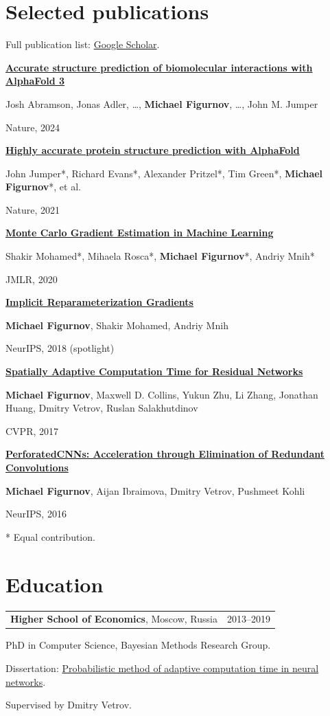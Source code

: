 \documentclass[10pt,a4paper]{article}
\makeatletter
\newcommand{\dated}[2]{\par\begin{tabularx}{\linewidth}{@{}Xr@{}}#1 & {\small\color{muted}#2}\end{tabularx}\par}
\newcommand{\paper}[4]{%
  \vspace{3pt}\href{#1}{\textbf{#2}}\par
  {\small #3\par}
  {\small\color{muted}#4\par}
}
\makeatother
\begin{document}
\section*{Selected publications}
{\small Full publication list: \href{https://scholar.google.com/citations?user=qd0tOpQAAAAJ}{Google Scholar}.\par}

\paper{https://www.nature.com/articles/s41586-024-07487-w}
{Accurate structure prediction of biomolecular interactions with AlphaFold 3}
{Josh Abramson, Jonas Adler, \ldots, \textbf{Michael Figurnov}, \ldots, John M. Jumper}
{Nature, 2024}

\paper{https://www.nature.com/articles/s41586-021-03819-2}
{Highly accurate protein structure prediction with AlphaFold}
{John Jumper*, Richard Evans*, Alexander Pritzel*, Tim Green*, \textbf{Michael Figurnov}*, et al.}
{Nature, 2021}

\paper{https://arxiv.org/abs/1906.10652}
{Monte Carlo Gradient Estimation in Machine Learning}
{Shakir Mohamed*, Mihaela Rosca*, \textbf{Michael Figurnov}*, Andriy Mnih*}
{JMLR, 2020}

\paper{https://arxiv.org/abs/1805.08498}
{Implicit Reparameterization Gradients}
{\textbf{Michael Figurnov}, Shakir Mohamed, Andriy Mnih}
{NeurIPS, 2018 (spotlight)}

\paper{https://arxiv.org/abs/1612.02297}
{Spatially Adaptive Computation Time for Residual Networks}
{\textbf{Michael Figurnov}, Maxwell D. Collins, Yukun Zhu, Li Zhang, Jonathan Huang, Dmitry Vetrov, Ruslan Salakhutdinov}
{CVPR, 2017}

\paper{https://arxiv.org/abs/1504.08362}
{PerforatedCNNs: Acceleration through Elimination of Redundant Convolutions}
{\textbf{Michael Figurnov}, Aijan Ibraimova, Dmitry Vetrov, Pushmeet Kohli}
{NeurIPS, 2016}
{\footnotesize\color{muted}* Equal contribution.\par}

\newpage
\section*{Education}
\dated{\textbf{Higher School of Economics}, Moscow, Russia}{2013--2019}
PhD in Computer Science, Bayesian Methods Research Group.\par
Dissertation: \href{https://www.hse.ru/sci/diss/218813299}{Probabilistic method of adaptive computation time in neural networks}.\par
Supervised by Dmitry Vetrov.
\end{document}
